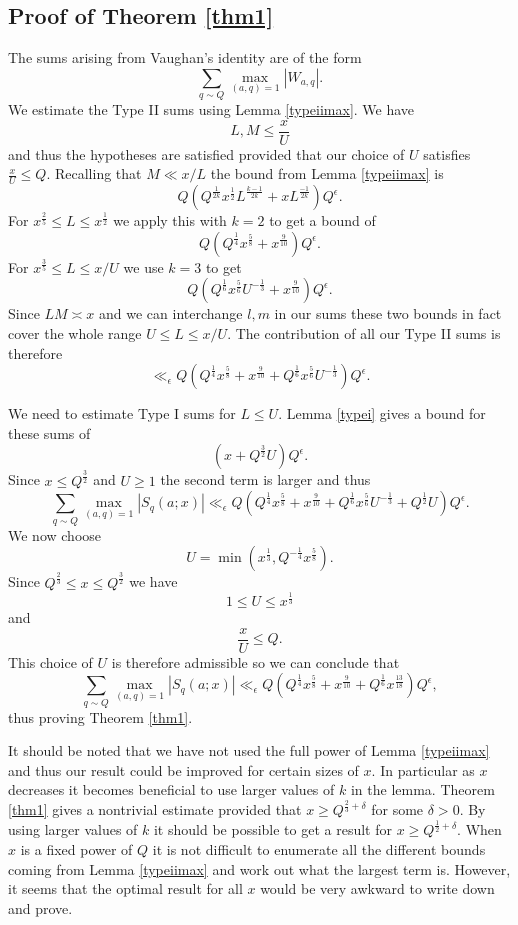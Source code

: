 \documentclass[12pt]{article}
\begin{document}
\subsection{Proof of Theorem \ref{thm1}}

The sums arising from Vaughan's identity are of the form 
$$\sum_{q\sim Q}\max_{(a,q)=1}|W_{a,q}|.$$
We estimate the Type II sums using Lemma \ref{typeiimax}.  We have 
$$L,M\leq \frac{x}{U}$$
and thus the hypotheses are satisfied provided that our choice of $U$ satisfies $\frac xU\leq Q$.  Recalling that $M\ll x/L$ the bound from Lemma \ref{typeiimax} is 
$$Q(Q^{\frac{1}{2k}}x^{\frac12}L^{\frac{k-1}{2k}}+xL^{\frac{-1}{2k}})Q^\epsilon.$$
For $x^{\frac25}\leq L\leq x^{\frac12}$ we apply this with $k=2$ to get a bound of 
$$Q(Q^{\frac{1}{4}}x^{\frac58}+x^{\frac{9}{10}})Q^\epsilon.$$
For $x^{\frac35}\leq L\leq x/U$ we use  $k=3$ to get 
$$Q(Q^{\frac{1}{6}}x^{\frac56}U^{-\frac13}+x^{\frac{9}{10}})Q^\epsilon.$$
Since $LM\asymp x$ and we can interchange $l,m$ in our sums these two bounds in fact cover the whole range $U\leq L\leq x/U$.  The contribution of all our Type II sums is therefore 
$$\ll_\epsilon Q(Q^{\frac{1}{4}}x^{\frac58}+x^{\frac{9}{10}}+Q^{\frac16}x^{\frac56}U^{-\frac13})Q^\epsilon.$$

We need to estimate Type I sums for $L\leq U$.  Lemma \ref{typei} gives a bound for these sums of 
$$(x+Q^{\frac32}U)Q^\epsilon.$$
Since $x\leq Q^{\frac32}$ and $U\geq 1$ the second term is larger and thus 
$$\sum_{q\sim Q}\max_{(a,q)=1}|S_q(a;x)|\ll_\epsilon Q(Q^{\frac{1}{4}}x^{\frac58}+x^{\frac{9}{10}}+Q^{\frac16}x^{\frac56}U^{-\frac13}+Q^{\frac12}U)Q^\epsilon.$$
We now choose 
$$U=\min(x^{\frac13},Q^{-\frac14}x^{\frac58}).$$
Since $Q^{\frac23}\leq x\leq Q^{\frac32}$ we have 
$$1\leq U\leq x^{\frac13}$$
and 
$$\frac{x}{U}\leq Q.$$
This choice of $U$ is therefore admissible so we can conclude that 
$$\sum_{q\sim Q}\max_{(a,q)=1}|S_q(a;x)|\ll_\epsilon Q(Q^{\frac{1}{4}}x^{\frac58}+x^{\frac{9}{10}}+Q^{\frac16}x^{\frac{13}{18}})Q^\epsilon,$$
thus proving Theorem \ref{thm1}.

It should be noted that we have not used the full power of Lemma \ref{typeiimax} and thus our result could be improved for certain sizes of $x$.  In particular as $x$ decreases it becomes beneficial to use larger  values of $k$ in the lemma.  Theorem \ref{thm1} gives a nontrivial estimate provided that $x\geq Q^{\frac23+\delta}$ for some $\delta>0$.  By using larger values of $k$ it should be possible to get a result for $x\geq Q^{\frac12+\delta}$.  When $x$ is a fixed power of $Q$ it is not difficult to enumerate all the different bounds coming from Lemma \ref{typeiimax} and work out what the largest term is.  However, it seems that the optimal result for all $x$ would be very awkward to write down and prove.
\end{document}
